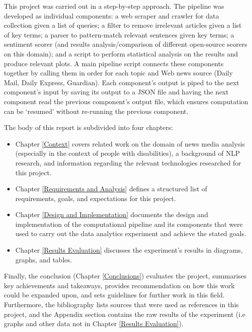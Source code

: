 \documentclass{report}
\begin{document}
This project was carried out in a step-by-step approach. The pipeline was developed as individual components: a web scraper and crawler for data collection given a list of queries; a filter to remove irrelevant articles given a list of key terms; a parser to pattern-match relevant sentences given key terms; a sentiment scorer (and results analysis/comparison of different open-source scorers on this domain); and a script to perform statistical analysis on the results and produce relevant plots. 
A main pipeline script connects these components together by calling them in order for each topic and Web news source (Daily Mail, Daily Express, Guardian).
Each component's output is piped to the next component's input by saving its output to a JSON file and having the next component read the previous component's output file, which ensures computation can be `resumed' without re-running the previous component. 

The body of this report is subdivided into four chapters:
\begin{itemize}
	\item Chapter \ref{Context} covers related work on the domain of news media analysis (especially in the context of people with disabilities), a background of NLP research, and information regarding the relevant technologies researched for this project.
	\item Chapter \ref{Requirements and Analysis} defines a structured list of requirements, goals, and expectations for this project.
	\item Chapter \ref{Design and Implementation} documents the design and implementation of the computational pipeline and its components that were used to carry out the data analytics experiment and achieve the stated goals.
	\item Chapter \ref{Results Evaluation} discusses the experiment's results in diagrams, graphs, and tables.
\end{itemize}
Finally, the conclusion (Chapter \ref{Conclusions}) evaluates the project, summarises key achievements and takeaways, provides recommendation on how this work could be expanded upon, and sets guidelines for further work in this field.
Furthermore, the bibliography lists sources that were used as references in this project, and the Appendix section contains the raw results of the experiment (i.e graphs and other data not in Chapter \ref{Results Evaluation}).
\end{document}
